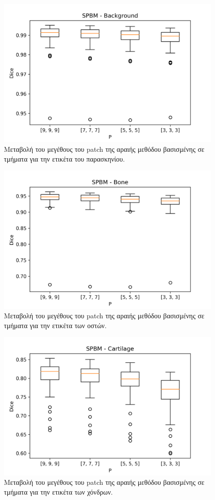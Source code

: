 \documentclass[a4paper,12pt]{article}
\begin{document}
\begin{figure}[H]
    \centering
    \includegraphics[width=0.85\linewidth]{SPBM_P_Background_plot.png}
    \caption{Μεταβολή του μεγέθους του patch της αραιής μεθόδου βασισμένης σε
             τμήματα για την ετικέτα του παρασκηνίου.}
    \label{fig:SPBM:P:1}
\end{figure}

\begin{figure}[H]
    \centering
    \includegraphics[width=0.85\linewidth]{SPBM_P_Bone_plot.png}
    \caption{Μεταβολή του μεγέθους του patch της αραιής μεθόδου βασισμένης σε
             τμήματα για την ετικέτα των οστών.}
    \label{fig:SPBM:P:2}
\end{figure}

\begin{figure}[H]
    \centering
    \includegraphics[width=0.85\linewidth]{SPBM_P_Cartilage_plot.png}
    \caption{Μεταβολή του μεγέθους του patch της αραιής μεθόδου βασισμένης σε
             τμήματα για την ετικέτα των χόνδρων.}
    \label{fig:SPBM:P:3}
\end{figure}
\end{document}
